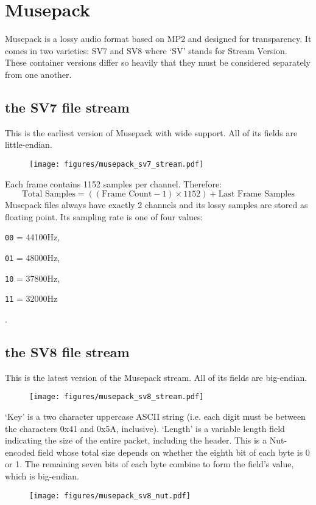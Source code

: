 \chapter{Musepack}
Musepack is a lossy audio format based on MP2 and designed for
transparency.
It comes in two varieties: SV7 and SV8 where `SV' stands for
Stream Version.
These container versions differ so heavily that they must be
considered separately from one another.
\section{the SV7 file stream}
This is the earliest version of Musepack with wide support.
All of its fields are little-endian.
\begin{figure}[h]
\texttt{[image: figures/musepack\_sv7\_stream.pdf]}
\end{figure}
Each frame contains 1152 samples per channel.
Therefore:
\begin{equation}
\text{Total Samples} = ((\text{Frame Count} - 1) \times 1152) + \text{Last Frame Samples}
\end{equation}
Musepack files always have exactly 2 channels and its lossy samples
are stored as floating point.
Its sampling rate is one of four values:

\begin{inparaenum}
\item[\texttt{00} = ] 44100Hz,
\item[\texttt{01} = ] 48000Hz,
\item[\texttt{10} = ] 37800Hz,
\item[\texttt{11} = ] 32000Hz
\end{inparaenum}
.

\pagebreak

\section{the SV8 file stream}
This is the latest version of the Musepack stream.
All of its fields are big-endian.
\begin{figure}[h]
\texttt{[image: figures/musepack\_sv8\_stream.pdf]}
\end{figure}
\par
\noindent
`Key' is a two character uppercase ASCII string
(i.e. each digit must be between the characters 0x41 and 0x5A, inclusive).
`Length' is a variable length field indicating the size of the entire packet,
including the header.
This is a Nut-encoded field whose total size depends on whether
the eighth bit of each byte is 0 or 1.
The remaining seven bits of each byte combine to form the field's value,
which is big-endian.
\begin{figure}[h]
\texttt{[image: figures/musepack\_sv8\_nut.pdf]}
\end{figure}

